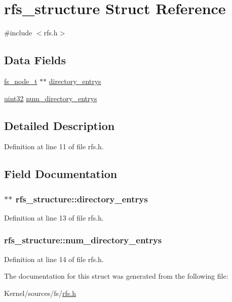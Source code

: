 \hypertarget{structrfs__structure}{
\section{rfs\_\-structure Struct Reference}
\label{structrfs__structure}
}


{\ttfamily \#include $<$rfs.h$>$}

\subsection*{Data Fields}
\begin{DoxyCompactItemize}
\item 
\hyperlink{structfilesystem__node}{fs\_\-node\_\-t} $\ast$$\ast$ \hyperlink{structrfs__structure_ace358d81015610c5405498bf8957224d}{directory\_\-entrys}
\item 
\hyperlink{int__types_8h_a1134b580f8da4de94ca6b1de4d37975e}{uint32} \hyperlink{structrfs__structure_af4de81a5525b69240e72d3a6f0411d8f}{num\_\-directory\_\-entrys}
\end{DoxyCompactItemize}


\subsection{Detailed Description}


Definition at line 11 of file rfs.h.



\subsection{Field Documentation}
\hypertarget{structrfs__structure_ace358d81015610c5405498bf8957224d}{
\subsubsection[{directory\_\-entrys}]{$\ast$$\ast$ {\bf rfs\_\-structure::directory\_\-entrys}}}
\label{structrfs__structure_ace358d81015610c5405498bf8957224d}


Definition at line 13 of file rfs.h.

\hypertarget{structrfs__structure_af4de81a5525b69240e72d3a6f0411d8f}{
\subsubsection[{num\_\-directory\_\-entrys}]{ {\bf rfs\_\-structure::num\_\-directory\_\-entrys}}}
\label{structrfs__structure_af4de81a5525b69240e72d3a6f0411d8f}


Definition at line 14 of file rfs.h.



The documentation for this struct was generated from the following file:\begin{DoxyCompactItemize}
\item 
Kernel/sources/fs/\hyperlink{rfs_8h}{rfs.h}\end{DoxyCompactItemize}
